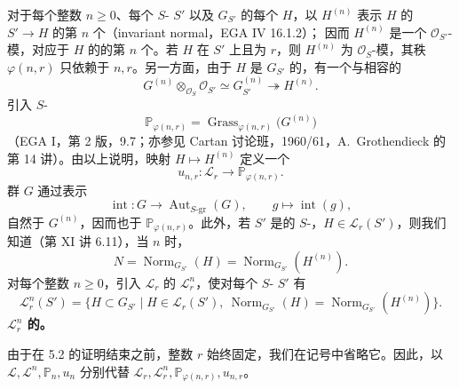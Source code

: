 对于每个整数 $n\geq0$、每个 $S$- $S'$ 以及 $G_{S'}$ 的每个 $H$，以 $H^{(n)}$ 表示 $H$ 的 $S'\to H$ 的第 $n$ 个（invariant normal，EGA IV 16.1.2）；
因而 $H^{(n)}$ 是一个 $\mathcal O_{S'}$-模，对应于 $H$ 的的第 $n$ 个。若 $H$ 在 $S'$ 上且为 $r$，则 $H^{(n)}$ 为 $\mathcal O_S$-模，其秩 $\varphi(n,r)$ 只依赖于 $n,r$。另一方面，由于 $H$ 是 $G_{S'}$ 的，有一个与相容的
\[G^{(n)}\otimes_{\mathcal O_S}\mathcal O_{S'}\simeq G_{S'}^{(n)}\twoheadrightarrow H^{(n)}.\]
引入 $S$-
\[\mathbb P_{\varphi(n,r)}=\operatorname{Grass}_{\varphi(n,r)}\bigl(G^{(n)}\bigr)\]
（EGA I，第 2 版，9.7；亦参见 Cartan 讨论班，1960/61，A.~Grothendieck 的第 14 讲）。由以上说明，映射 $H\mapsto H^{(n)}$ 定义一个
\[u_{n,r}:\mathscr L_r\longrightarrow\mathbb P_{\varphi(n,r)}.\]
群 $G$ 通过表示
\[\operatorname{int}:G\longrightarrow\operatorname{Aut}_{S\text{-gr}}(G),\qquad g\longmapsto\operatorname{int}(g),\]
自然于 $G^{(n)}$，因而也于 $\mathbb P_{\varphi(n,r)}$。此外，若 $S'$ 是的 $S$-，$H\in\mathscr L_r(S')$，则我们知道（第 XI 讲 6.11），当 $n$ 时，
\[N=\operatorname{Norm}_{G_{S'}}(H)=\operatorname{Norm}_{G_{S'}}(H^{(n)}).\]
对每个整数 $n\geq0$，引入 $\mathscr L_r$ 的 $\mathscr L_r^n$，使对每个 $S$- $S'$ 有
\[\mathscr L_r^n(S')=\{H\subset G_{S'}\mid H\in\mathscr L_r(S'),\ \operatorname{Norm}_{G_{S'}}(H)=\operatorname{Norm}_{G_{S'}}(H^{(n)})\}.\]
\textbf{$\mathscr L_r^n$ 的。}

由于在 5.2 的证明结束之前，整数 $r$ 始终固定，我们在记号中省略它。因此，以 $\mathscr L,\mathscr L^n,\mathbb P_n,u_n$ 分别代替 $\mathscr L_r,\mathscr L_r^n,\mathbb P_{\varphi(n,r)},u_{n,r}$。

